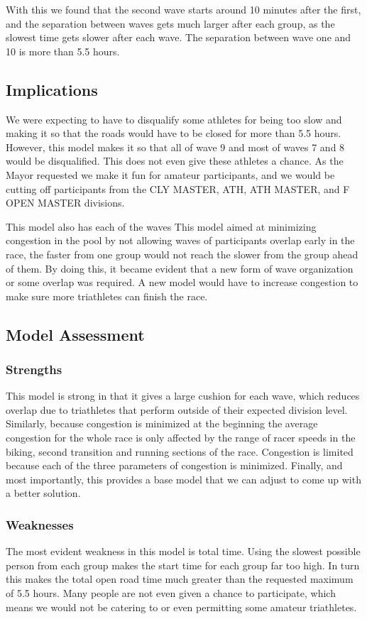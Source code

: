 \documentclass[12pt]{article}
\begin{document}
With this we found that the second wave starts around 10 minutes after the first, and the separation between waves gets much larger after each group, as the slowest time gets slower after each wave. The separation between wave one and 10 is more than 5.5 hours.

\subsection{Implications}
We were expecting to have to disqualify some athletes for being too slow and making it so that the roads would have to be closed for more than 5.5 hours. However, this model makes it so that all of wave 9 and most of waves 7 and 8 would be disqualified. This does not even give these athletes a chance. As the Mayor requested we make it fun for amateur participants, and we would be cutting off participants from the CLY MASTER, ATH, ATH MASTER, and F OPEN MASTER divisions.\par{}
This model also has each of the waves 
This model aimed at minimizing congestion in the pool by not allowing waves of participants overlap early in the race, the faster from one group would not reach the slower from the group ahead of them. By doing this, it became evident that a new form of wave organization or some overlap was required. A new model would have to increase congestion to make sure more triathletes can finish the race.
\subsection{Model Assessment}
\subsubsection*{Strengths}
  This model is strong in that it gives a large cushion for each wave, which reduces overlap due to triathletes that perform outside of their expected division level. Similarly, because congestion is minimized at the beginning the average congestion for the whole race is only affected by the range of racer speeds in the biking, second transition and running sections of the race. Congestion is limited because each of the three parameters of congestion is minimized. Finally, and most importantly, this provides a base model that we can adjust to come up with a better solution.
\subsubsection*{Weaknesses}
  The most evident weakness in this model is total time. Using the slowest possible person from each group makes the start time for each group far too high. In turn this makes the total open road time much greater than the requested maximum of 5.5 hours. Many people are not even given a chance to participate, which means we would not be catering to or even permitting some amateur triathletes.
  
\end{document}
